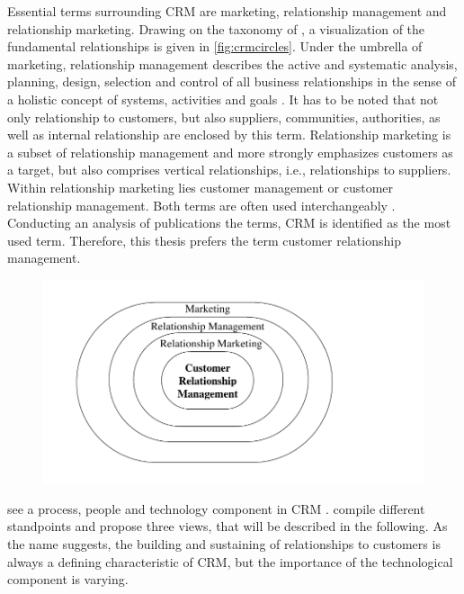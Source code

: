 		Essential terms surrounding CRM are marketing, relationship management and relationship marketing. Drawing on the taxonomy of \citep{hippnerwilde2011}, a visualization of the fundamental relationships is given in \Fig \ref{fig:crmcircles}. Under the umbrella of marketing, relationship management describes the active and systematic analysis, planning, design, selection and control of all business relationships in the sense of a holistic concept of systems, activities and goals \citep[]{diller1995}. It has to be noted that not only relationship to customers, but also suppliers, communities, authorities, as well as internal relationship are enclosed by this term. Relationship marketing is a subset of relationship management and more strongly emphasizes customers as a target, but also comprises vertical relationships, i.e., relationships to suppliers. Within relationship marketing lies customer management or customer relationship management. Both terms are often used interchangeably  \citep{Leuer2011,ryals2001customer}. Conducting an analysis of publications \wrt the terms, \acrshort{CRM} is identified as the most used term. Therefore, this thesis prefers the term customer relationship management.
		
		\begin{figure}[caption={CRM in the field of marketing}, label={fig:crmcirlces}]
			{	\includegraphics[width=.8\textwidth]{figures/crmcircles.pdf}}
		\end{figure}
	
		\citeauthor{Chen_2003} see a process, people and technology component in \acrshort{CRM} \citep{Chen_2003}. \cite{paynefrow2005} compile different standpoints and propose three views, that will be described in the following. As the name suggests, the building and sustaining of relationships to customers is always a defining characteristic of \acrshort{CRM}, but the importance of the technological component is varying. 
		
